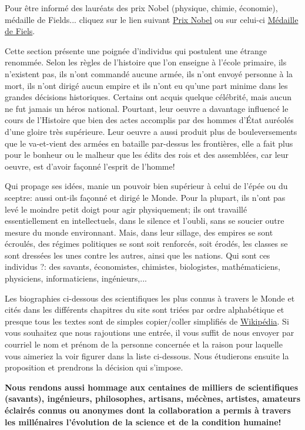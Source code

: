 Pour être informé des lauréats des prix Nobel (physique, chimie, économie), médaille de Fields... cliquez sur le lien suivant {\href{http://www.nobelprize.org/}{{\color{blue}Prix Nobel}}} ou sur celui-ci {\href{http://www.fields.utoronto.ca/aboutus/jcfields/fields_medal.html}{{\color{blue}Médaille de Fiels}}}.

Cette section présente une poignée d'individus qui postulent une étrange renommée. Selon les règles de l'histoire que l'on enseigne à l'école primaire, ils n'existent pas, ils n'ont commandé aucune armée, ils n'ont envoyé personne à la mort, ils n'ont dirigé aucun empire et ils n'ont eu qu'une part minime dans les grandes décisions historiques. Certains ont acquis quelque célébrité, mais aucun ne fut jamais un héros national. Pourtant, leur oeuvre a davantage influencé le cours de l'Histoire que bien des actes accomplis par des hommes d'État auréolés d'une gloire très supérieure. Leur oeuvre a aussi produit plus de bouleversements que le va-et-vient des armées en bataille par-dessus les frontières, elle a fait plus pour le bonheur ou le malheur que les édits des rois et des assemblées, car leur oeuvre, est d'avoir façonné l'esprit de l'homme!

Qui propage ses idées, manie un pouvoir bien supérieur à celui de l'épée ou du sceptre: aussi ont-ils façonné et dirigé le Monde. Pour la plupart, ils n'ont pas levé le moindre petit doigt pour agir physiquement; ils ont travaillé essentiellement en intellectuels, dans le silence et l'oubli, sans se soucier outre mesure du monde environnant. Mais, dans leur sillage, des empires se sont écroulés, des régimes politiques se sont soit renforcés, soit érodés, les classes se sont dressées les unes contre les autres, ainsi que les nations. Qui sont ces individus ?: des savants, économistes, chimistes, biologistes, mathématiciens, physiciens, informaticiens, ingénieurs,...

Les biographies ci-dessous des scientifiques les plus connus à travers le Monde et cités dans les différents chapitres du site sont triées par ordre alphabétique et presque tous les textes sont de simples copier/coller simplifiés de {\href{http://www.wikipedia.fr}{{\color{blue}Wikipédia}}}. Si vous souhaitez que nous rajoutions une entrée, il vous suffit de nous envoyer par courriel le nom et prénom de la personne concernée et la raison pour laquelle vous aimeriez la voir figurer dans la liste ci-dessous. Nous étudierons ensuite la proposition et prendrons la décision qui s'impose.

\textbf{Nous rendons aussi hommage aux centaines de milliers de scientifiques (savants), ingénieurs, philosophes, artisans, mécènes, artistes, amateurs éclairés connus ou anonymes dont la collaboration a permis à travers les millénaires l'évolution de la science et de la condition humaine!}

